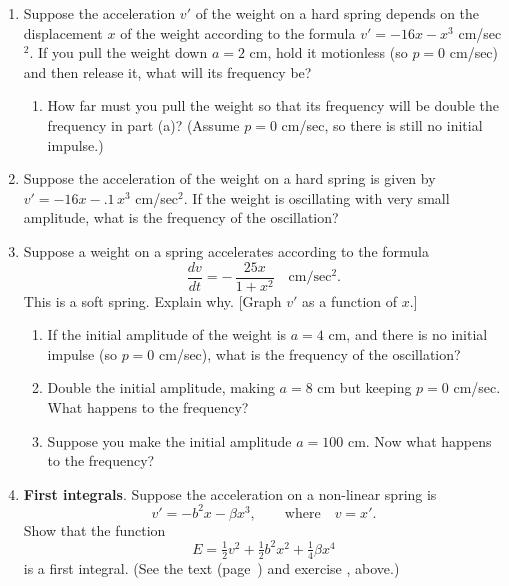 \begin{enumerate}
\item Suppose the acceleration $v'$ of the weight on a hard spring
depends on the displacement $x$ of the weight according to the formula
$v' = -16x - x^3$ cm/sec$^2$.  If you pull the weight down $a = 2$ cm,
hold it motionless (so $p = 0$ cm/sec) and then release it, what will
its frequency be?

  \begin{enumerate}
  \item How far must you pull the weight so that its frequency will be
double the frequency in part (a)?  (Assume $p = 0$ cm/sec, so there is
still no initial impulse.)


\end{enumerate}
\item Suppose the acceleration of the weight on a hard spring is given
by $v' = -16x - .1\,x^3$ cm/sec$^2$.  If the weight is oscillating
with very small amplitude, what is the frequency of the oscillation?


\item Suppose a weight on a spring accelerates according to the formula
	\[
\dfrac{dv}{dt} = - \, \dfrac{25x}{1 + x^2} \quad \mbox{cm/sec$^2$}.
\]
This is a soft spring.  Explain why.  [Graph $v'$ as a function of $x$.]




  \begin{enumerate}
  \item If the initial amplitude of the weight is $a = 4$ cm, and there
is no initial impulse (so $p = 0$ cm/sec), what is the frequency of
the oscillation?

  \item Double the initial amplitude, making $a = 8$ cm but keeping $p =
0$ cm/sec.  What happens to the frequency?

  \item Suppose you make the initial amplitude $a = 100$ cm.  Now what
happens to the frequency?


\end{enumerate}
\item {\bf First integrals}.\label{spring energy}
Suppose the acceleration on a non-linear spring is
	\[
v' = -b^2x - \beta x^3, \qquad \mbox{where} \quad v = x'.
\]
Show that the function 
	\[
E = \tfrac{1}{2} v^2 + \tfrac{1}{2} b^2 x^2
		+ \tfrac{1}{4} \beta x^4
\]
is a first integral.  (See the text (page~\pageref{firstint}) and
exercise \thefirstintexercise, above.)



\end{enumerate}
